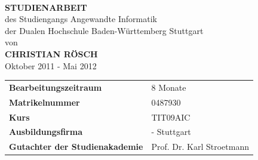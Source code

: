 \thispagestyle{empty}

\parbox[t]{\paperwidth}{}
\begin{center}
	\vspace{15mm}	{\LARGE\bf\thema}\\
	\vspace{20mm}	{\Large\bf STUDIENARBEIT}\\
	\vspace{15mm}	des Studiengangs Angewandte Informatik\\der Dualen Hochschule Baden-Württemberg Stuttgart\\
	\vspace{7,5mm}	von\\
	\vspace{7,5mm}	{\bf CHRISTIAN RÖSCH}\\
	\vspace{10mm}	Oktober 2011 - Mai 2012
	\vspace{30mm}
\end{center}
\begin{longtable}{p{}p{}}
	\textbf{Bearbeitungszeitraum}				&  8 Monate\\
	\textbf{Matrikelnummer}						&  0487930\\
	\textbf{Kurs}								&  TIT09AIC\\
	\textbf{Ausbildungsfirma}					&  \icon - Stuttgart\\
	\textbf{Gutachter der Studienakademie}	& Prof. Dr. Karl Stroetmann  \\
\end{longtable}